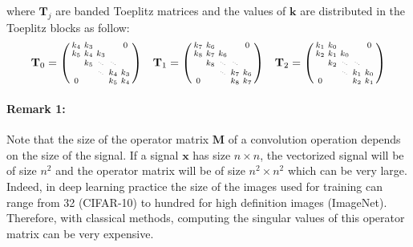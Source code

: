 where $\mathbf{T}_j$ are banded Toeplitz matrices and the values of $\mathbf{k}$ are distributed in the Toeplitz blocks as follow:
\begin{align}
\mathbf{T}_0 = \begin{psmallmatrix}
    k_{4} & k_{3} &  &  &  0 \\
    k_{5} & k_{4} & k_{3} &  &   \\
     & k_{5} & \scalebox{.40}{$\ddots$} & \scalebox{.40}{$\ddots$}  \\
     &  &  \scalebox{.40}{$\ddots$} & k_{4} & k_{3}  \\
    0 &  &  & k_{5} & k_{4}  \\
    \end{psmallmatrix} &&
\mathbf{T}_{1} = \begin{psmallmatrix}
    k_{7} & k_{6} &  &  &  0 \\
    k_{8} & k_{7} & k_{6} &  &   \\
     & k_{8} & \scalebox{.40}{$\ddots$} & \scalebox{.40}{$\ddots$} &    \\
     &  &  \scalebox{.40}{$\ddots$} & k_{7} & k_{6}  \\
    0 &  &  & k_{8} & k_{7}  \\
    \end{psmallmatrix} &&
\mathbf{T}_{2} = \begin{psmallmatrix}
    k_{1} & k_{0} &  &  &  0 \\
    k_{2} & k_{1} & k_{0} &  &   \\
     & k_{2} & \scalebox{.40}{$\ddots$} & \scalebox{.40}{$\ddots$} &    \\
     &  &  \scalebox{.40}{$\ddots$} & k_{1} & k_{0}  \\
    0 &  &  & k_{2} & k_{1}  \\
    \end{psmallmatrix} 
\end{align}


\paragraph{Remark 1: } Note that the size of the operator matrix $\mathbf{M}$ of a convolution operation depends on the size of the signal. If a signal $\mathbf{x}$ has size $n \times n$, the vectorized signal will be of size $n^2$ and the operator matrix will be of size $n^2 \times n^2$ which can be very large. Indeed, in deep learning practice the size of the images used for training can range from 32 (CIFAR-10) to hundred for high definition images (ImageNet). Therefore, with classical methods, computing the singular values of this operator matrix can be very expensive.

